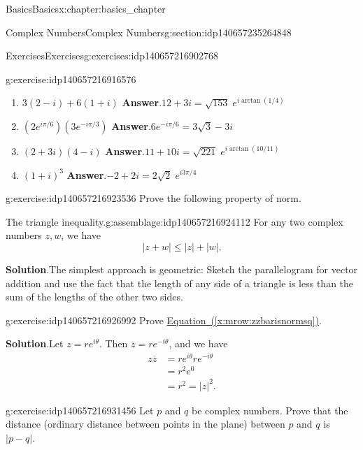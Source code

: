 \documentclass[oneside,10pt,]{book}
\numberwithin{equation}{section}
\newcommand{\amp}{&}
\begin{document}
\begin{chapterptx}{Basics}{}{Basics}{}{}{x:chapter:basics_chapter}
\begin{sectionptx}{Complex Numbers}{}{Complex Numbers}{}{}{g:section:idp140657235264848}
\begin{exercises-subsection}{Exercises}{}{Exercises}{}{}{g:exercises:idp140657216902768}
\begin{divisionexercise}{2}{}{}{g:exercise:idp140657216916576}
\begin{enumerate}[label=(\alph*)]
\item{}\(3(2-i) + 6(1+i)\) \textbf{Answer}.\quad{}\(12+3i=\sqrt{153}\;e^{i\arctan(1/4)}\)%
\item{}\(\left(2e^{i\pi/6}\right)\left(3e^{-i\pi/3}\right)\) \textbf{Answer}.\quad{}\(6e^{-i\pi/6}=3\sqrt{3}-3i\)%
\item{}\((2+3i)(4-i)\) \textbf{Answer}.\quad{}\(11+10i=\sqrt{221}\;e^{i\arctan(10/11)}\)%
\item{}\((1+i)^3\) \textbf{Answer}.\quad{}\(-2+2i=2\sqrt{2}\;e^{i3\pi/4}\)%
\end{enumerate}
\end{divisionexercise}%
\begin{divisionexercise}{3}{}{}{g:exercise:idp140657216923536}%
Prove the following property of norm. \begin{assemblage}{The triangle inequality.}{g:assemblage:idp140657216924112}%
For any two complex numbers \(z,w\), we have%
\begin{equation*}
|z+w|\leq |z|+|w|.
\end{equation*}
%
\end{assemblage}
\par\smallskip%
\noindent\textbf{Solution}.\hypertarget{g:solution:idp140657216926240}{}\quad{}The simplest approach is geometric: Sketch the parallelogram for vector addition and use the fact that the length of any side of a triangle is less than the sum of the lengths of the other two sides.\end{divisionexercise}%
\begin{divisionexercise}{4}{}{}{g:exercise:idp140657216926992}%
Prove \hyperref[x:mrow:zzbarisnormsq]{Equation~(\ref{x:mrow:zzbarisnormsq})}.\par\smallskip%
\noindent\textbf{Solution}.\hypertarget{g:solution:idp140657216928336}{}\quad{}Let \(z=re^{i\theta}\).  Then \(\overline{z}=re^{-i\theta}\), and we have%
\begin{align*}
z\overline{z} \amp = re^{i\theta}re^{-i\theta}\\
\amp = r^2 e^0\\
\amp = r^2 = |z|^2.
\end{align*}
\end{divisionexercise}%
\begin{divisionexercise}{5}{}{}{g:exercise:idp140657216931456}%
Let \(p\) and \(q\) be complex numbers.  Prove that the distance (ordinary distance between points in the plane) between \(p\) and \(q\) is \(|p-q|\).\par\smallskip%

\end{divisionexercise}
\end{exercises-subsection}
\end{sectionptx}
\end{chapterptx}
\end{document}
